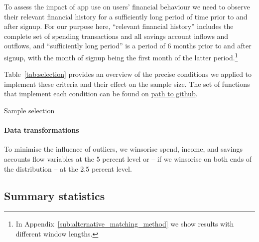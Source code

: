 To assess the impact of app use on users' financial behaviour we need to
observe their relevant financial history for a sufficiently long period of time
prior to and after signup. For our purpose here, ``relevant
financial history'' includes the complete set of spending transactions and all
savings account inflows and outflows, and ``sufficiently long period'' is a
period of 6 months prior to and after signup, with the month of signup being
the first month of the latter period.\footnote{In
Appendix~\ref{sub:alternative_matching_method} we show results with different
window lengths. }

Table~\ref{tab:selection} provides an overview of the precise conditions we applied to implement
these criteria and their effect on the sample size. The set of functions that
implement each condition can be found on \href{path-to-github}{path to github}.

\begin{table}
\centering
\caption{Sample selection}\label{tab:selection}

\end{table}

\paragraph{Data transformations}%
\label{par:data_transformations}

To minimise the influence of outliers, we winsorise spend, income, and savings
accounts flow variables at the 5 percent level or -- if we winsorise on both
ends of the distribution -- at the 2.5 percent level.






\subsection{Summary statistics}%
\label{sub:summary_statistics}

